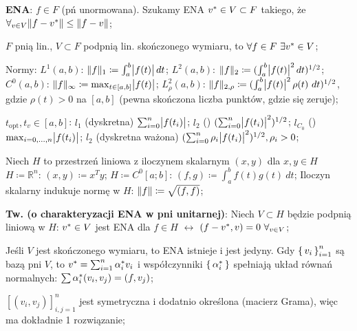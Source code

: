 
\entry
\textbf{ENA}:
$f \in F$
(pń unormowana).
Szukamy ENA
$v^{*} \in V \subset F$ takiego, że
$\forall_{v \in V} \|f - v^{*}\| \leq \|f-v\|$;

\entry
$F$ pnią lin.,
$V \subset F$ podpnią lin. skończonego wymiaru, to
$\forall{f \in F} \ \exists{\enain{v}{V}}$;

\entry
Normy:
\subentry
$L^1(a,b)$:
$\|f\|_1 \coloneqq \int^b_a\abs{f(t)} dt$;
\subentry
$L^2(a,b)$:
$\|f\|_2 \coloneqq (\int^b_a\abs{f(t)}^2 dt)^{1/2}$;
\subentry
$C^0(a,b)$:
$\|f\|_\infty \coloneqq \max_{t \in [a,b]} \abs{f(t)}$;
\subentry
$L^2_\rho(a,b)$:
$\|f\|_{2, \rho} \coloneqq (\int^b_a\abs{f(t)}^2 \rho(t) \ dt)^{1/2}$,
gdzie
$\rho(t) > 0$ na $[a,b]$
(pewna skończona liczba punktów, gdzie się zeruje);


\entry
$t_{\text{opt}}, t_v \in [a,b]$:
\subentry
$l_1$ (dyskretna)
$\sum^n_{i=0} \abs{f(t_i)}$;
\subentry
$l_2$ (\dittotikz)
$(\sum^n_{i=0} \abs{f(t_i)}^2)^{1/2}$;
\subentry
$l_{C_0}$ (\dittotikz)
$\max_{i = 0,\ldots,n} \abs{f(t_i)}$;
\subentry
$l_2$ (dyskretna ważona)
$(\sum^n_{i=0} \rho_i\abs{f(t_i)}^2)^{1/2}, \rho_i>0$;

\entry
Niech $H$ to przestrzeń liniowa z iloczynem skalarnym
$(x,y)$ dla $x, y \in H$
\subentry
$H \coloneqq \mathbb{R}^n$:
$(x,y) \coloneqq x^T y$;
\subentry
$H \coloneqq C^0[a;b]$:
$(f,g) \coloneqq \int^b_a f(t)g(t) \ dt$;
\subentry
Iloczyn skalarny indukuje normę w $H$:
$\|f\| \coloneqq \sqrt{(f,f)}$;

\entry
\textbf{Tw. (o charakteryzacji ENA w pni unitarnej)}:
Niech $V \subset H$ będzie podpnią liniową w $H$:
$v^{*} \in V$ jest ENA dla $f \in H$
$\leftrightarrow$
$(f - \ena{v}, v) = 0 \ \forallin{v}{V}$;

\entry
Jeśli $V$ jest skończonego wymiaru, to ENA istnieje i jest jedyny.
Gdy $\set{v_i}^n_{i=1}$ są bazą pni $V$, to
$v^{*} = \sum^n_{i=1} \alpha^{*}_i v_i$
i współczynniki $\set{\alpha^{*}_i}$
spełniają układ równań normalnych:
$\sum \alpha^{*}_i (v_i, v_j) = (f, v_j)$;

\entry
$[(v_i, v_j)]^n_{i,j=1}$
jest symetryczna i dodatnio określona (macierz Grama),
więc ma dokładnie 1 rozwiązanie;

